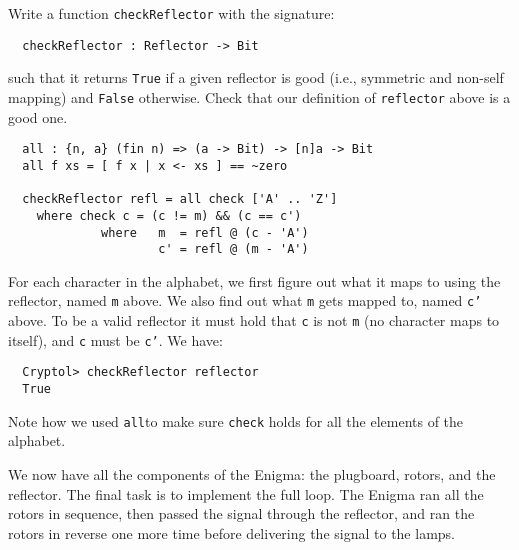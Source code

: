 \begin{Exercise}\label{ex:enigma:6}
Write a function {\tt checkReflector} with the signature:
\begin{Verbatim}
  checkReflector : Reflector -> Bit
\end{Verbatim}
such that it returns {\tt True} if a given reflector is good (i.e.,
symmetric and non-self mapping) and {\tt False} otherwise. Check that
our definition of {\tt reflector} above is a good one. 
\end{Exercise}
\begin{Answer}
\begin{Verbatim}
  all : {n, a} (fin n) => (a -> Bit) -> [n]a -> Bit
  all f xs = [ f x | x <- xs ] == ~zero

  checkReflector refl = all check ['A' .. 'Z']
    where check c = (c != m) && (c == c')
             where   m  = refl @ (c - 'A')
                     c' = refl @ (m - 'A')
\end{Verbatim}
For each character in the alphabet, we first figure out what it maps
to using the reflector, named {\tt m} above. We also find out what
{\tt m} gets mapped to, named {\tt c'} above. To be a valid reflector
it must hold that {\tt c} is not {\tt m} (no character maps to
itself), and {\tt c} must be {\tt c'}. We have:
\begin{Verbatim}
  Cryptol> checkReflector reflector
  True
\end{Verbatim}
Note how we used {\tt all}\indAll to make sure {\tt check} holds for
all the elements of the alphabet.
\end{Answer}


We now have all the components of the Enigma: the plugboard, rotors,
and the reflector.  The final task is to implement the full loop. The
Enigma ran all the rotors in sequence, then passed the signal through
the reflector, and ran the rotors in reverse one more time before
delivering the signal to the lamps.

